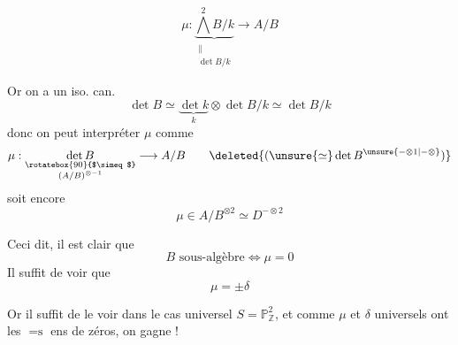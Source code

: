 \[
\mu:\underbrace{\bigwedge^2 B/k}_{\substack{\parallel\\\det B/k}}\longrightarrow A/B
\]

Or on a un iso. can.
\[
\det B\simeq\underbrace{\det k}_{k}\otimes\det B/k\simeq\det B/k
\]
donc on peut interpréter $\mu$ comme
\[
\mu:\underset{\substack{\rotatebox{90}{$\simeq$}\\(A/B)^{\otimes-1}}}{\det B}\longrightarrow A/B
\qquad\deleted{(\unsure{\simeq}\det B^{\unsure{-\otimes1|-\otimes}})}
\]
soit encore
\[
\mu\in A/B^{\otimes2}\simeq D^{-\otimes2}
\]

Ceci dit, il est clair que
\[
B\text{ sous-algèbre}\Longleftrightarrow\mu=0
\]
Il suffit de voir que
\[
\mu=\pm\delta
\]

Or il suffit de le voir dans le cas universel $S=\mathbb{P}^2_{\mathbb{Z}}$, et comme   $\mu$ et $\delta$  universels ont les $=\text{s}$  ens de zéros, on gagne !
